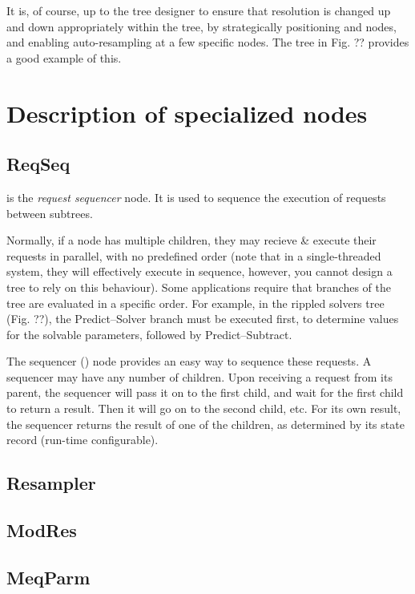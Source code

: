 \documentclass[10pt]{article}
\begin{document}
  It is, of course, up to the tree designer to ensure that resolution is
  changed up and down appropriately within the tree, by strategically
  positioning  and  nodes, and enabling
  auto-resampling at a few specific nodes. The tree in Fig. ?? provides a good
  example of this.


\section{Description of specialized nodes}

\subsection{ReqSeq}

   is the {\em request sequencer} node. It is used to sequence the
  execution of requests between subtrees.
  
  Normally, if a node has multiple children, they may recieve \& execute their
  requests in parallel, with no predefined order (note that in a
  single-threaded system, they will effectively execute in sequence, however,
  you cannot design a tree to rely on this behaviour). Some applications
  require that branches of the tree are evaluated in a specific order. For
  example, in the rippled solvers tree (Fig. ??), the Predict--Solver branch
  must be executed first, to determine values for the solvable parameters,
  followed by Predict--Subtract.
  
  The sequencer () node provides an easy way to sequence these
  requests. A sequencer may have any number of children. Upon receiving a
  request from its parent, the sequencer will pass it on to the first child,
  and wait for the first child to return a result. Then it will go on to the
  second child, etc. For its own result, the sequencer returns the result of
  one of the children, as determined by its state record (run-time
  configurable).

\subsection{Resampler}

\subsection{ModRes}

\subsection{MeqParm}
\end{document}

